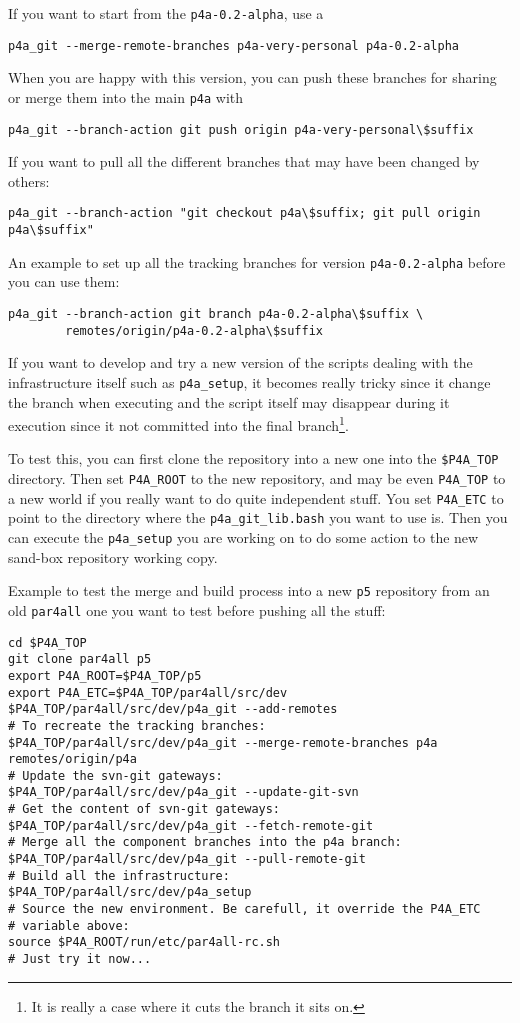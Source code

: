 \documentclass[a4paper]{article}
\begin{document}
If you want to start from the \texttt{p4a-0.2-alpha}, use a
\begin{verbatim}
p4a_git --merge-remote-branches p4a-very-personal p4a-0.2-alpha
\end{verbatim}

When you are happy with this version, you can push these branches for
sharing or merge them into the main \Apfa \texttt{p4a} with
\begin{verbatim}
p4a_git --branch-action git push origin p4a-very-personal\$suffix
\end{verbatim}

If you want to pull all the different \Apfa branches that may have been
changed by others:
\begin{verbatim}
p4a_git --branch-action "git checkout p4a\$suffix; git pull origin p4a\$suffix"
\end{verbatim}

An example to set up all the tracking branches for version
\texttt{p4a-0.2-alpha} before you can use them:
\begin{verbatim}
p4a_git --branch-action git branch p4a-0.2-alpha\$suffix \
        remotes/origin/p4a-0.2-alpha\$suffix
\end{verbatim}
\texttt{}
If you want to develop and try a new version of the scripts dealing with
the \Apfa infrastructure itself such as \verb|p4a_setup|, it becomes
really tricky since it change the branch when executing and the script
itself may disappear during it execution since it not committed into the
final branch\footnote{It is really a case where it cuts the branch it sits
on. \smiley}.

To test this, you can first clone the repository into a new one into the
\verb|$P4A_TOP| %
directory. Then set \verb|P4A_ROOT| to the new repository,
and may be even \verb|P4A_TOP| to a new world if you really want to do
quite independent stuff. You set \verb|P4A_ETC| to point to the directory
where the \verb|p4a_git_lib.bash| you want to use is. Then you can execute
the \verb|p4a_setup| you are working on to do some action to the new
sand-box repository working copy.

Example to test the merge and build process into a new \texttt{p5}
repository from an old \texttt{par4all} one you want to test before
pushing all the stuff:
\begin{verbatim}
cd $P4A_TOP
git clone par4all p5
export P4A_ROOT=$P4A_TOP/p5
export P4A_ETC=$P4A_TOP/par4all/src/dev
$P4A_TOP/par4all/src/dev/p4a_git --add-remotes
# To recreate the tracking branches:
$P4A_TOP/par4all/src/dev/p4a_git --merge-remote-branches p4a remotes/origin/p4a
# Update the svn-git gateways:
$P4A_TOP/par4all/src/dev/p4a_git --update-git-svn
# Get the content of svn-git gateways:
$P4A_TOP/par4all/src/dev/p4a_git --fetch-remote-git
# Merge all the component branches into the p4a branch:
$P4A_TOP/par4all/src/dev/p4a_git --pull-remote-git
# Build all the infrastructure:
$P4A_TOP/par4all/src/dev/p4a_setup
# Source the new environment. Be carefull, it override the P4A_ETC
# variable above:
source $P4A_ROOT/run/etc/par4all-rc.sh
# Just try it now...
\end{verbatim}
\end{document}

